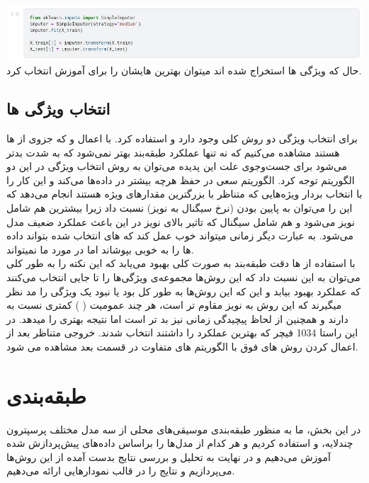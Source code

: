 \documentclass[10pt,onecolumn,a4paper]{article}
\begin{document}
\includegraphics[scale=0.6]{11.jpg}
\\
حال که ویژگی ها استخراج شده اند میتوان بهترین هایشان را برای آموزش  انتخاب کرد.\\

\subsection{انتخاب ویژگی ها}
برای انتخاب ویژگی دو روش کلی وجود دارد  و  استفاده کرد. با اعمال  و  که جزوی از  ها هستند مشاهده می‌کنیم که نه تنها عملکرد طبقه‌بند بهتر نمی‌شود که به شدت بدتر می‌شود برای جست‌وجوی علت این پدیده می‌توان به روش انتخاب ویژگی در این دو الگوریتم توجه کرد. الگوریتم   سعی در حفظ هرچه بیشتر  در داده‌ها می‌کند و این کار را با انتخاب بردار ویژه‌هایی که متناظر با بزرگترین مقدارهای ویژه هستند انجام می‌دهد که این را می‌توان به پایین بودن  (نرخ سیگنال به نویز) نسبت داد زیرا بیشترین  هم شامل نویز می‌شود و هم شامل سیگنال که تاثیر بالای نویز در این  باعث عملکرد ضعیف مدل می‌شود.  به عبارت دیگر   زمانی میتواند خوب عمل کند که  های انتخاب شده بتواند   داده ها را به خوبی بپوشاند اما در مورد ما نمیتواند.
\\
با استفاده از  ها دقت طبقه‌بند به صورت کلی بهبود می‌یابد که این نکته را به طور کلی می‌توان به این نسبت داد که این روش‌ها مجموعه‌‌ی ویژگی‌ها را تا جایی انتخاب می‌کنند که عملکرد بهبود بیابد و این که این روش‌ها به طور کل بود یا نبود یک ویژگی را مد نظر میگیرند که این روش به نویز مقاوم تر است، هر چند عمومیت ( ) کمتری نسبت به   دارند و همچنین از لحاظ پیچیدگی زمانی نیز بد تر است اما نتیجه بهتری را میدهد. در این راستا 1034 فیچر که بهترین عملکرد را داشتند انتخاب شدند.   
	خروجی متناظر بعد از اعمال کردن روش های فوق با الگوریتم های متفاوت در قسمت بعد  مشاهده می شود. 





\pagebreak
\section{طبقه‌بندی}
 در این بخش، ما به منظور طبقه‌بندی موسیقی‌های محلی از سه مدل مختلف  پرسپترون چندلایه،   و  استفاده کردیم و هر کدام از مدل‌ها را براساس داده‌های پیش‌پردازش شده آموزش می‌دهیم و در نهایت به تحلیل و بررسی نتایج بدست آمده از این روش‌ها می‌پردازیم و  نتایج را در قالب نمودارهایی ارائه می‌دهیم. 
 \\
\end{document}
